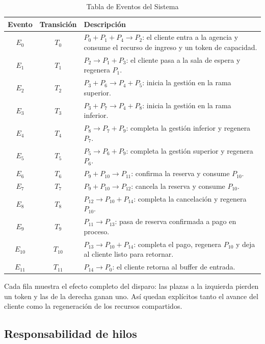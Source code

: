 \documentclass[11pt,a4paper]{article}
\begin{document}
\begin{table}[H]
\centering
\caption{Tabla de Eventos del Sistema}
\small
\begin{tabularx}{\textwidth}{@{} c c X @{}}
\toprule
\textbf{Evento} & \textbf{Transición} & \textbf{Descripción} \\ \midrule
$E_0$ & $T_0$ & $P_0+P_1+P_4\rightarrow P_2$: el cliente entra a la agencia y consume el recurso de ingreso y un token de capacidad. \\
$E_1$ & $T_1$ & $P_2\rightarrow P_1+P_3$: el cliente pasa a la sala de espera y regenera $P_1$. \\
$E_2$ & $T_2$ & $P_3+P_6\rightarrow P_4+P_5$: inicia la gestión en la rama superior. \\
$E_3$ & $T_3$ & $P_3+P_7\rightarrow P_4+P_8$: inicia la gestión en la rama inferior. \\
$E_4$ & $T_4$ & $P_8\rightarrow P_7+P_9$: completa la gestión inferior y regenera $P_7$. \\
$E_5$ & $T_5$ & $P_5\rightarrow P_6+P_9$: completa la gestión superior y regenera $P_6$. \\
$E_6$ & $T_6$ & $P_9+P_{10}\rightarrow P_{11}$: confirma la reserva y consume $P_{10}$. \\
$E_7$ & $T_7$ & $P_9+P_{10}\rightarrow P_{12}$: cancela la reserva y consume $P_{10}$. \\
$E_8$ & $T_8$ & $P_{12}\rightarrow P_{10}+P_{14}$: completa la cancelación y regenera $P_{10}$. \\
$E_9$ & $T_9$ & $P_{11}\rightarrow P_{13}$: pasa de reserva confirmada a pago en proceso. \\
$E_{10}$ & $T_{10}$ & $P_{13}\rightarrow P_{10}+P_{14}$: completa el pago, regenera $P_{10}$ y deja al cliente listo para retornar. \\
$E_{11}$ & $T_{11}$ & $P_{14}\rightarrow P_0$: el cliente retorna al buffer de entrada. \\ \bottomrule
\end{tabularx}
\end{table}

Cada fila muestra el efecto completo del disparo: las plazas a la izquierda
pierden un token y las de la derecha ganan uno. Así quedan explícitos tanto el
avance del cliente como la regeneración de los recursos compartidos.

\subsection{Responsabilidad de hilos}
\end{document}
